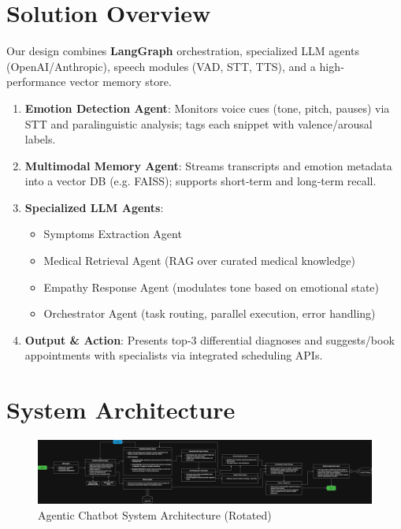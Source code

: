 \documentclass[11pt,a4paper]{article}
\begin{document}
\section{Solution Overview}
Our design combines \textbf{LangGraph} orchestration, specialized LLM agents (OpenAI/Anthropic), speech modules (VAD, STT, TTS), and a high‐performance vector memory store.
\begin{enumerate}[left=0pt]
  \item \textbf{Emotion Detection Agent}: Monitors voice cues (tone, pitch, pauses) via STT and paralinguistic analysis; tags each snippet with valence/arousal labels.
  \item \textbf{Multimodal Memory Agent}: Streams transcripts and emotion metadata into a vector DB (e.g. FAISS); supports short‐term and long‐term recall.
  \item \textbf{Specialized LLM Agents}: 
    \begin{itemize}[left=0pt]
      \item Symptoms Extraction Agent
      \item Medical Retrieval Agent (RAG over curated medical knowledge)
      \item Empathy Response Agent (modulates tone based on emotional state)
      \item Orchestrator Agent (task routing, parallel execution, error handling)
    \end{itemize}
  \item \textbf{Output \& Action}: Presents top‐3 differential diagnoses and suggests/book appointments with specialists via integrated scheduling APIs.
\end{enumerate}

\section{System Architecture}
\begin{landscape} %
\begin{figure}[h!]
  \centering
  \includegraphics[height=0.31\textheight]{ChatBot_Healthcare_flow.png}
  \caption{Agentic Chatbot System Architecture (Rotated)}
  \label{fig:architecture}
\end{figure}
\end{landscape}
\end{document}
